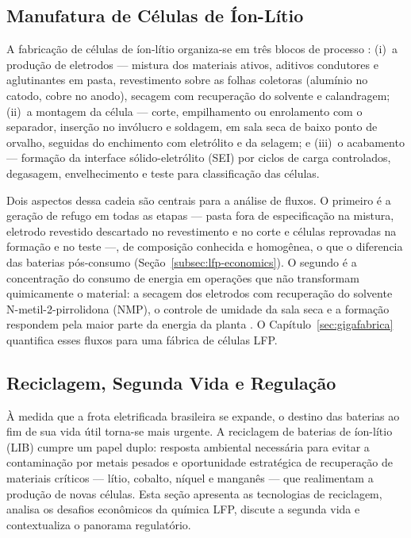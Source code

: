 \subsection{Manufatura de Células de Íon-Lítio}
\label{sec:manufatura}

A fabricação de células de íon-lítio organiza-se em três blocos de processo
\cite{knehr2022batpac,degen2022}: (i)~a produção de eletrodos — mistura dos
materiais ativos, aditivos condutores e aglutinantes em pasta, revestimento sobre
as folhas coletoras (alumínio no catodo, cobre no anodo), secagem com recuperação
do solvente e calandragem; (ii)~a montagem da célula — corte, empilhamento ou
enrolamento com o separador, inserção no invólucro e soldagem, em sala seca de
baixo ponto de orvalho, seguidas do enchimento com eletrólito e da selagem; e
(iii)~o acabamento — formação da interface sólido-eletrólito (SEI) por ciclos de
carga controlados, degasagem, envelhecimento e teste para classificação das
células.

Dois aspectos dessa cadeia são centrais para a análise de fluxos. O primeiro é a
geração de refugo em todas as etapas — pasta fora de especificação na mistura,
eletrodo revestido descartado no revestimento e no corte e células reprovadas na
formação e no teste —, de composição conhecida e homogênea, o que o diferencia das
baterias pós-consumo (Seção~\ref{subsec:lfp-economics}). O segundo é a
concentração do consumo de energia em operações que não transformam
quimicamente o material: a secagem dos eletrodos com recuperação do solvente
N-metil-2-pirrolidona (NMP), o controle de umidade da sala seca e a formação
respondem pela maior parte da energia da planta \cite{degen2022}. O
Capítulo~\ref{sec:gigafabrica} quantifica esses fluxos para uma fábrica de células
LFP.

\subsection{Reciclagem, Segunda Vida e Regulação}
\label{sec:reciclagem}

À medida que a frota eletrificada brasileira se expande, o destino das baterias ao
fim de sua vida útil torna-se mais urgente. A reciclagem de baterias de íon-lítio
(LIB) cumpre um papel duplo: resposta ambiental necessária para evitar a
contaminação por metais pesados e oportunidade estratégica de recuperação de
materiais críticos — lítio, cobalto, níquel e manganês — que realimentam a
produção de novas células. Esta seção apresenta as tecnologias de reciclagem,
analisa os desafios econômicos da química LFP, discute a segunda vida e
contextualiza o panorama regulatório.

